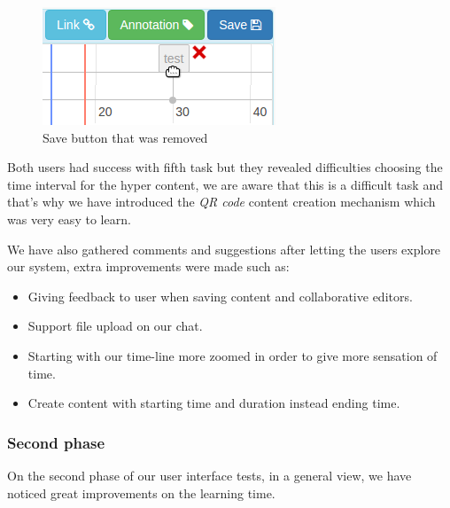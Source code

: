 \begin{figure}
\centering
\begin{minipage}[b]{0.3\linewidth}
\centering

    \includegraphics[width=\textwidth]{figures/test_ui_05.png}
\end{minipage}


    \caption{Save button that was removed}
    \label{fig:test_ui_05}
\end{figure}

Both users had success with fifth task but they revealed difficulties choosing the time interval for the hyper content, we are aware that this is a difficult task and that's why we have introduced the \emph{QR code} content creation mechanism which was very easy to learn.

We have also gathered comments and suggestions after letting the users explore our system, extra improvements were made such as:

\begin{itemize}
\item Giving feedback to user when saving content and collaborative editors.
\item Support file upload on our chat.
\item Starting with our time-line more zoomed in order to give more sensation of time.
\item Create content with starting time and duration instead ending time.
\end{itemize}

  \subsubsection {Second phase}

On the second phase of our user interface tests, in a general view, we have noticed great improvements on the learning time.

